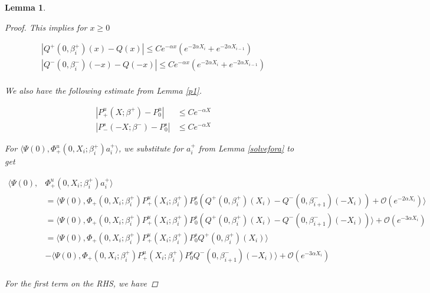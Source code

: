 \documentclass[12pt]{article}
\newtheorem{lemma}{Lemma}
\begin{document}
\begin{lemma}
\begin{proof}
This implies for $x \geq 0$

\begin{align*}
|Q^+(0, \beta_i^+)(x) - Q(x)| \leq C e^{-\alpha x} (e^{-2 \alpha X_i} + e^{-2 \alpha X_{i-1}}) \\
|Q^-(0, \beta_i^-)(-x) - Q(-x)| \leq C e^{-\alpha x} (e^{-2 \alpha X_i} + e^{-2 \alpha X_{i-1}}) \\
\end{align*}

We also have the following estimate from Lemma \ref{p1}.

\begin{align*}
|P^u_+(X; \beta^+) - P_0^u| &\leq C e^{-\alpha X} \\
|P^s_-(-X; \beta^-) - P_0^s| &\leq C e^{-\alpha X}
\end{align*}

For $\langle \Psi(0), \Phi^u_+(0, X_i; \beta_i^+) a_i^+ \rangle $, we substitute for $a_i^+$ from Lemma \ref{solvefora} to get

\begin{align*}
\langle \Psi(0), &\Phi^u_+(0, X_i; \beta_i^+) a_i^+ \rangle \\
&= \langle \Psi(0), \Phi_+(0, X_i; \beta_i^+) P^u_+(X_i; \beta_i^+) P^s_0 \left( Q^+(0, \beta_i^+)(X_i) - Q^-(0, \beta_{i+1}^-)(-X_i) \right) 
+ \mathcal{O}( e^{-2 \alpha X_i} ) \rangle \\
&= \langle \Psi(0), \Phi_+(0, X_i; \beta_i^+) P^u_+(X_i; \beta_i^+) P^s_0 \left( Q^+(0, \beta_i^+)(X_i) - Q^-(0, \beta_{i+1}^-)(-X_i) \right) \rangle  
+ \mathcal{O}( e^{-3 \alpha X_i} ) \\
&= \langle \Psi(0), \Phi_+(0, X_i; \beta_i^+) P^u_+(X_i; \beta_i^+) P^s_0 Q^+(0, \beta_i^+)(X_i) \rangle \\
&- \langle \Psi(0), \Phi_+(0, X_i; \beta_i^+) P^u_+(X_i; \beta_i^+) P^s_0 Q^-(0, \beta_{i+1}^-)(-X_i) \rangle
+ \mathcal{O}( e^{-3 \alpha X_i} ) \\
\end{align*}

For the first term on the RHS, we have


\end{proof}
\end{lemma}
\end{document}
